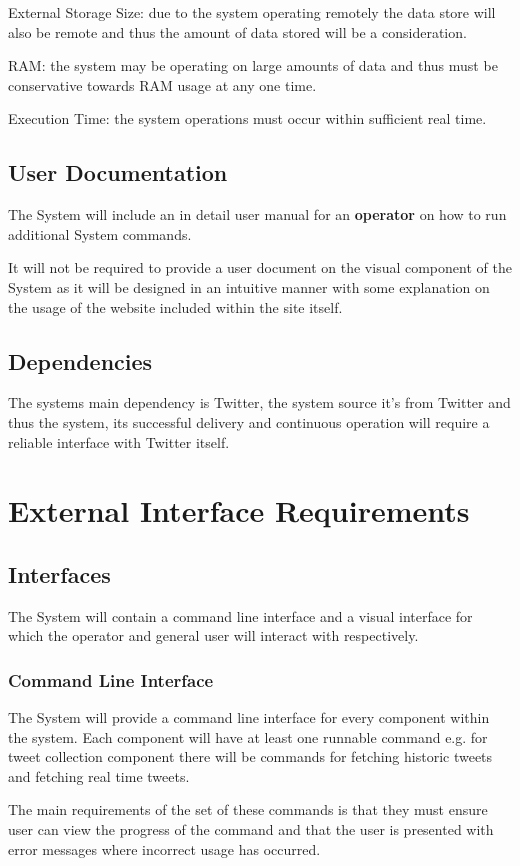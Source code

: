 \documentclass[11pt]{report}
\begin{document}
External Storage Size: due to the system operating remotely the data store will also be remote and thus the amount of data stored will be a consideration.

RAM: the system may be operating on large amounts of data and thus must be conservative towards RAM usage at any one time.

Execution Time: the system operations must occur within sufficient real time.

\subsection*{User Documentation}
The System will include an in detail user manual for an \textbf{operator} on how to run additional System commands.

It will not be required to provide a user document on the visual component of the System as it will be designed in an intuitive manner with some explanation on the usage of the website included within the site itself.

\subsection*{Dependencies}
The systems main dependency is Twitter, the system source it's from Twitter and thus the system, its successful delivery and continuous operation will require a reliable interface with Twitter itself.


\section*{External Interface Requirements}
\subsection*{Interfaces}
The System will contain a command line interface and a visual interface for which the operator and general user will interact with respectively.

\subsubsection*{Command Line Interface}
The System will provide a command line interface for every component within the system. Each component will have at least one runnable command e.g. for tweet collection component there will be commands for fetching historic tweets and fetching real time tweets.

The main requirements of the set of these commands is that they must ensure user can view the progress of the command and that the user is presented with error messages where incorrect usage has occurred.
\\
\end{document}
